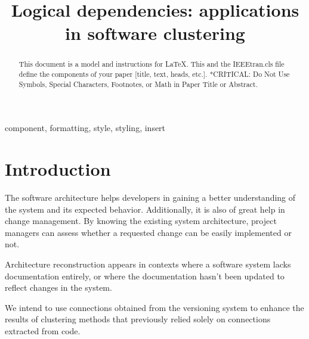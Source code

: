 \documentclass[conference]{IEEEtran}
\begin{document}
\title{Logical dependencies: applications in software clustering} %

\author{
\and
{}
}

\maketitle

\begin{abstract}
This document is a model and instructions for \LaTeX.
This and the IEEEtran.cls file define the components of your paper [title, text, heads, etc.]. *CRITICAL: Do Not Use Symbols, Special Characters, Footnotes, 
or Math in Paper Title or Abstract.
\end{abstract}

\begin{IEEEkeywords}
component, formatting, style, styling, insert
\end{IEEEkeywords}

\section{Introduction}

The software architecture helps developers in gaining a better understanding of the system and its expected behavior. Additionally, it is also of great help in change management. By knowing the existing system architecture, project managers can assess whether a requested change can be easily implemented or not.

Architecture reconstruction appears in contexts where a software system lacks documentation entirely, or where the documentation hasn't been updated to reflect changes in the system. 


We intend to use connections obtained from the versioning system to enhance the results of clustering methods that previously relied solely on connections extracted from code.
\end{document}
